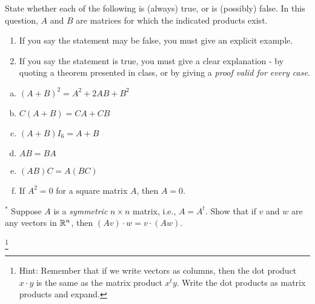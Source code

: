 \begin{prob} \label{prob14.3} State whether each of the following is (always) true,
or is (possibly) false.     In this question, $A$ and $B$ are matrices for which the indicated products exist.
   \smallskip    
\begin{enumerate}[$\bullet$]
\item If you say the statement may be false, you must give an explicit example.   
\item If you say the statement is true, you must give a clear explanation -   by quoting a theorem presented in class, or by giving a {\it proof valid for every  case}. 
\end{enumerate}
\medskip
\begin{enumerate}[a)]
\item  $(A+B)^2= A^2 + 2 AB + B^2$
\medskip
%
\item\sov $C(A+B)=CA+CB$
\medskip
%
\item $(A+B)I_6=A+B$
\medskip
%
\item\sov $AB=BA$
\medskip
%
\item $(AB)C=A(BC)$
\medskip
%
\item\sov  If $A^2=0$ for a square matrix $A$, then $A=0$.
\medskip
%
\end{enumerate}
 
\end{prob} \begin{prob} \label{prob14.4}$^\ast$ Suppose $A$ is a {\it symmetric} $n \times n$ matrix, i.e., $A=A^t$. Show that if $v$ and $w$ are any vectors in $\mathbb{R}^n$, then $(Av)\cdot w= v \cdot (Aw)$.\end{prob}\footnote{ Hint: Remember that if we write vectors as columns, then the dot product $x\cdot y$ is the same as the matrix product $x^t y$. Write the dot products as matrix products and expand.}

\bigskip

